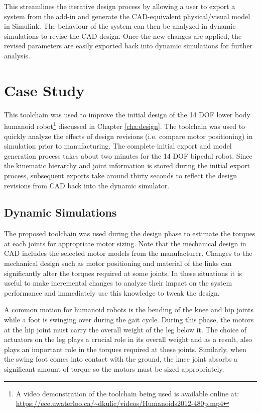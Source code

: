 This streamlines the iterative design process by allowing a user to export a system from the add-in and generate the CAD-equivalent physical/visual model in Simulink. The behaviour of the system can then be analyzed in dynamic simulations to revise the CAD design. Once the new changes are applied, the revised parameters are easily exported back into dynamic simulations for further analysis.


\section{Case Study} %
\label{sec:case_study}

This toolchain was used to improve the initial design of the 14 DOF lower body humanoid robot\footnote{A video demonstration of the toolchain being used is available online at: \\ \url{https://ece.uwaterloo.ca/~dkulic/videos/Humanoids2012-480p.mp4}} discussed in Chapter \ref{cha:design}. The toolchain was used to quickly analyze the effects of design revisions (i.e. compare motor positioning) in simulation prior to manufacturing. The complete initial export and model generation process takes about two minutes for the 14 DOF bipedal robot. Since the kinematic hierarchy and joint information is stored during the initial export process, subsequent exports take around thirty seconds to reflect the design revisions from CAD back into the dynamic simulator. 

\subsection{Dynamic Simulations} %
\label{sub:dynamic_simulations}

The proposed toolchain was used during the design phase to estimate the torques at each joints for appropriate motor sizing. Note that the mechanical design in CAD includes the selected motor models from the manufacturer. Changes to the mechanical design such as motor positioning and material of the links can significantly alter the torques required at some joints. In these situations it is useful to make incremental changes to analyze their impact on the system performance and immediately use this knowledge to tweak the design.

A common motion for humanoid robots is the bending of the knee and hip joints while a foot is swinging over during the gait cycle. During this phase, the motors at the hip joint must carry the overall weight of the leg below it. The choice of actuators on the leg plays a crucial role in its overall weight and as a result, also plays an important role in the torques required at these joints. Similarly, when the swing foot comes into contact with the ground, the knee joint absorbs a significant amount of torque so the motors must be sized appropriately.

